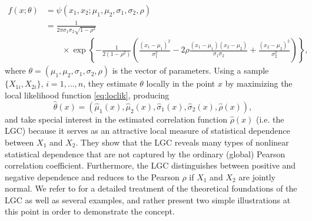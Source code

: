 \begin{align}
f(x;\theta) 
&= \psi(x_1, x_2;\mu_1, \mu_2, \sigma_1, \sigma_2, \rho)  \nonumber\\ 
&= \frac{1}{2\pi \sigma_1 \sigma_2\sqrt{1-\rho^2}} \nonumber \\
& \qquad \times\exp \left\{-\frac{1}{2(1-\rho^2)}\left(\frac{(x_1-\mu_1)^2}{\sigma_1^2}-2\rho\frac{(x_1-\mu_1)(x_2-\mu_2)}{\sigma_1 \sigma_2}+\frac{(x_2-\mu_2)^2}{\sigma_2^2}\right)\right\},
\label{eq:gaussian}
\end{align}
where $\theta = (\mu_1,\mu_2,\sigma_1,\sigma_2,\rho)$ is the vector of parameters. Using a sample $\{X_{1i}, X_{2i}\}$, $i = 1, \ldots, n$, they estimate $\theta$ locally in the point $x$ by maximizing the local likelihood function \eqref{eq:loclik}, producing
$$\widehat\theta(x) = (\widehat\mu_1(x), \widehat\mu_2(x), \widehat\sigma_1(x), \widehat\sigma_2(x), \widehat\rho(x)),$$
and take special interest in the estimated correlation function $\widehat\rho(x)$ (i.e. the LGC) because it serves as an attractive local measure of statistical dependence between $X_1$ and $X_2$. They show that the LGC reveals many types of nonlinear statistical dependence that are not captured by the ordinary (global) Pearson correlation coefficient. Furthermore, the LGC distinguishes between positive and negative dependence and reduces to the Pearson $\rho$ if $X_1$ and $X_2$ are jointly normal. We refer to \cite{tjos:huft:2013} for a detailed treatment of the theoretical foundations of the LGC as well as several examples, and rather present two simple illustrations at this point in order to demonstrate the concept. 

